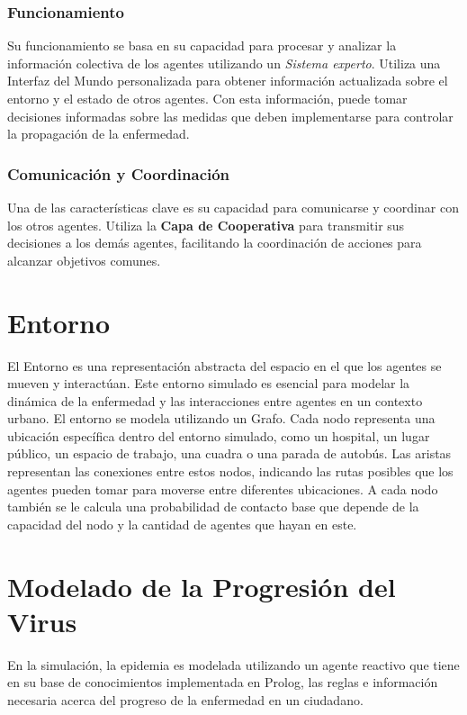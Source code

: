 \subsubsection{Funcionamiento}
Su funcionamiento se basa en su capacidad para procesar y analizar la información colectiva de los agentes utilizando un \textit{Sistema experto}. Utiliza una Interfaz del Mundo personalizada para obtener información actualizada sobre el entorno y el estado de otros agentes. Con esta información, puede tomar decisiones informadas sobre las medidas que deben implementarse para controlar la propagación de la enfermedad.

\subsubsection{Comunicación y Coordinación}
Una de las características clave es su capacidad para comunicarse y coordinar con los otros agentes. Utiliza la \textbf{Capa de Cooperativa} para transmitir sus decisiones a los demás agentes, facilitando la coordinación de acciones para alcanzar objetivos comunes.

\section{Entorno}
El Entorno es una representación abstracta del espacio en el que los agentes se mueven y interactúan. Este entorno simulado es esencial para modelar la dinámica de la enfermedad y las interacciones entre agentes en un contexto urbano. El entorno se modela utilizando un Grafo. Cada nodo representa una ubicación específica dentro del entorno simulado, como un hospital, un lugar público, un espacio de trabajo, una cuadra o una parada de autobús. Las aristas representan las conexiones entre estos nodos, indicando las rutas posibles que los agentes pueden tomar para moverse entre diferentes ubicaciones. A cada nodo también se le calcula una probabilidad de contacto base que depende de la capacidad del nodo y la cantidad de agentes que hayan en este.

\section{Modelado de la Progresión del Virus}
En la simulación, la epidemia es modelada utilizando un agente reactivo que tiene en su base de conocimientos implementada en Prolog, las reglas e información necesaria acerca del progreso de la enfermedad en un ciudadano.

